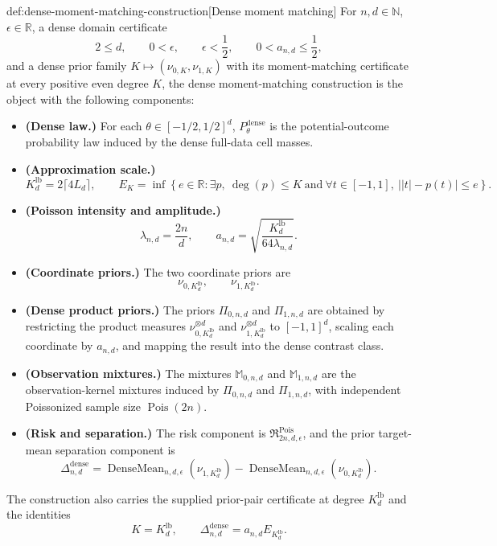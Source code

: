 \begin{definitionv}{def:dense-moment-matching-construction}[Dense moment matching]
For \(n,d\in\mathbb N\), \(\epsilon\in\mathbb R\), a dense domain certificate
\[
2\le d,\qquad
0<\epsilon,\qquad
\epsilon<\frac12,\qquad
0<a_{n,d}\le \frac12,
\]
and a dense prior family \(K\mapsto(\nu_{0,K},\nu_{1,K})\) with its moment-matching certificate at every positive even degree \(K\), the dense moment-matching construction is the object with the following components:
\begin{itemize}
\item \textbf{(Dense law.)} For each \(\theta\in[-1/2,1/2]^d\), \(P_\theta^{\mathrm{dense}}\) is the potential-outcome probability law induced by the dense full-data cell masses.
\item \textbf{(Approximation scale.)}
\[
K_d^{\mathrm{lb}}=2\lceil 4L_d\rceil,\qquad
E_K=\inf\left\{e\in\mathbb R:\exists p,\ \deg(p)\le K\ \text{and}\ 
\forall t\in[-1,1],\ \bigl||t|-p(t)\bigr|\le e\right\}.
\]
\item \textbf{(Poisson intensity and amplitude.)}
\[
\lambda_{n,d}=\frac{2n}{d},\qquad
a_{n,d}=\sqrt{\frac{K_d^{\mathrm{lb}}}{64\lambda_{n,d}}}.
\]
\item \textbf{(Coordinate priors.)} The two coordinate priors are
\[
\nu_{0,K_d^{\mathrm{lb}}},\qquad \nu_{1,K_d^{\mathrm{lb}}}.
\]
\item \textbf{(Dense product priors.)} The priors \(\Pi_{0,n,d}\) and \(\Pi_{1,n,d}\) are obtained by restricting the product measures \(\nu_{0,K_d^{\mathrm{lb}}}^{\otimes d}\) and \(\nu_{1,K_d^{\mathrm{lb}}}^{\otimes d}\) to \([-1,1]^d\), scaling each coordinate by \(a_{n,d}\), and mapping the result into the dense contrast class.
\item \textbf{(Observation mixtures.)} The mixtures \(\mathbb M_{0,n,d}\) and \(\mathbb M_{1,n,d}\) are the observation-kernel mixtures induced by \(\Pi_{0,n,d}\) and \(\Pi_{1,n,d}\), with independent Poissonized sample size \(\operatorname{Pois}(2n)\).
\item \textbf{(Risk and separation.)} The risk component is \(\mathfrak R^{\mathrm{Pois}}_{2n,d,\epsilon}\), and the prior target-mean separation component is
\[
\Delta_{n,d}^{\mathrm{dense}}
=
\operatorname{DenseMean}_{n,d,\epsilon}(\nu_{1,K_d^{\mathrm{lb}}})
-
\operatorname{DenseMean}_{n,d,\epsilon}(\nu_{0,K_d^{\mathrm{lb}}}).
\]
\end{itemize}
The construction also carries the supplied prior-pair certificate at degree \(K_d^{\mathrm{lb}}\) and the identities
\[
K=K_d^{\mathrm{lb}},\qquad
\Delta_{n,d}^{\mathrm{dense}}
=
a_{n,d}E_{K_d^{\mathrm{lb}}}.
\]
\end{definitionv}

